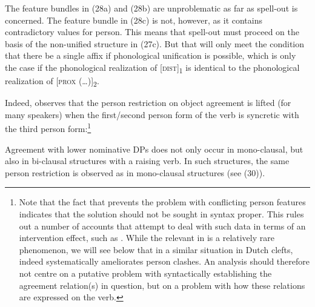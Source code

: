 \documentclass[output=paper]{langsci/langscibook}
\begin{document}
The feature bundles in (28a) and (28b) are unproblematic as far as spell-out is concerned. The feature bundle in (28c) is not, however, as it contains contradictory values for person. This means that spell-out must proceed on the basis of the non-unified structure in (27c). But that will only meet the condition that there be a single affix if phonological unification is possible, which is only the case if the phonological realization of [\textsc{dist}]\textsubscript{1} is identical to the phonological realization of [\textsc{prox} (…)]\textsubscript{2}.

Indeed, \citet{Sigurðsson1996} observes that the person restriction on object agreement is lifted (for many speakers) when the first\slash second person form of the verb is syncretic with the third person form:\footnote{Note that the fact that  prevents the problem with conflicting person features indicates that the solution should not be sought in syntax proper. This rules out a number of accounts that attempt to deal with such data in terms of an intervention effect, such as \citealt{Sigurðsson2008}. While the relevant  in  is a relatively rare phenomenon, we will see below that in a similar situation in Dutch clefts,  indeed systematically ameliorates person clashes. An analysis should therefore not centre on a putative problem with syntactically establishing the agreement relation(s) in question, but on a problem with how these relations are expressed on the verb.}

\ea \judgewidth{\%} 
\z \z

Agreement with lower nominative DPs does not only occur in mono-clausal, but also in bi-clausal structures with a raising verb. In such structures, the same person restriction is observed as in mono-clausal structures (see (30)). 
\end{document}
